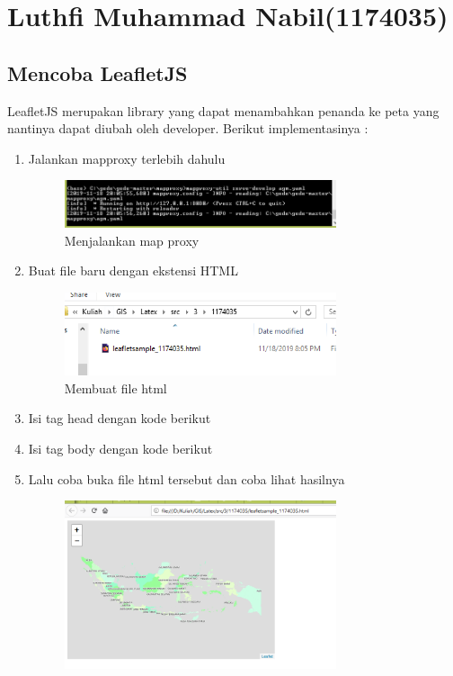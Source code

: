 \section{Luthfi Muhammad Nabil(1174035)}
\subsection{Mencoba LeafletJS}
LeafletJS merupakan library yang dapat menambahkan penanda ke peta yang nantinya dapat diubah oleh developer. Berikut implementasinya : 
\begin{enumerate}
    \item Jalankan mapproxy terlebih dahulu
    \hfill\break
    \begin{figure}[H]
        \includegraphics[width=8cm]{figures/1174035/tugas5/1.png}
        \centering
        \caption{Menjalankan map proxy}
    \end{figure}
    \item Buat file baru dengan ekstensi HTML
    \hfill\break
    \begin{figure}[H]
        \includegraphics[width=8cm]{figures/1174035/tugas5/2.png}
        \centering
        \caption{Membuat file html}
    \end{figure}
    \item Isi tag head dengan kode berikut
    
    \item Isi tag body dengan kode berikut
    
    \item Lalu coba buka file html tersebut dan coba lihat hasilnya
    \hfill\break
    \begin{figure}[H]
        \includegraphics[width=8cm]{figures/1174035/tugas5/3.png}

\end{figure}
\end{enumerate}
